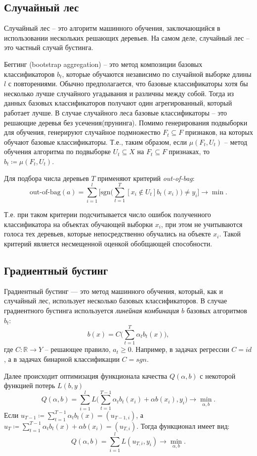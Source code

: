 \subsection{\centering Случайный лес}
Случайный лес -- это алгоритм машинного обучения, заключающийся в использовании нескольких решающих деревьев. На самом деле, случайный лес -- это частный случай бустинга.

Беггинг (bootstrap aggregation) -- это метод композиции базовых классификаторов $b_t$, которые обучаются независимо по случайной выборке длины $l$ с повторениями. Обычно предполагается, что базовые классификаторы хотя бы несколько лучше случайного угадывания и различны между собой. Тогда из данных базовых классификаторов получают один агрегированный, который работает лучше. В случае случайного леса базовые классификаторы -- это решающие деревья без усечения(прунинга). Помимо генерирования подвыборки для обучения, генерируют случайное подмножество $F_t \subseteq F$ признаков, на которых обучают базовые классификаторы. Т.е., таким образом, если $\mu(F_t, U_t)$ -- метод обучения алгоритма по подвыборке $U_t \subseteq X$ на $F_t \subseteq F$ признаках, то $b_t \coloneqq \mu(F_t, U_t)$.

Для подбора числа деревьев $T$ применяют критерий {\it out-of-bag}:
\[
	\mathrm{out\text{-}of\text{-}bag}(a) = \sum\limits_{i=1}^l\big[ \mathrm{sgn}\big(\sum\limits_{t=1}^T [x_i \notin U_t]b_t(x_i) \big) \neq y_i \big] \to \min.
\]

Т.е. при таком критерии подсчитывается число ошибок полученного классификатора на объектах обучающей выборки $x_i$, при этом не учитываются голоса тех деревьев, которые непосредственно обучались на объекте $x_i$. Такой критерий  является несмещенной оценкой обобщающей способности.

\subsection{\centering Градиентный бустинг}
Градиентный бустинг — это метод машинного обучения, который, как и случайный лес, использует несколько базовых классификаторов. В случае градиентного бустинга используется {\it линейная комбинация} $b$ базовых алгоритмов $b_t$:
\[
	b(x) = C\big(\sum\limits_{t=1}^T \alpha_t b_t(x)\big),
\]
где $C: \mathbb{R} \to Y$ -- решающее правило, $a_t \geq 0$. Например, в задачах регрессии $C = id$, а в задачах бинарной классификации $C = sgn$.

Далее происходит оптимизация функционала качества $Q(\alpha, b)$ с некоторой функцией потерь $L(b,y)$
\[
	Q(\alpha, b) = \sum_{i=1}^lL\big(\sum_{t=1}^{T-1} \alpha_t b_t(x_i) + \alpha b(x_i), y_i\big) \to \min\limits_{\alpha, b}.
\]
Если $u_{T-1} \coloneqq \sum\limits_{t=1}^{T-1} \alpha_t b_t(x) = (u_{T-1, i})$, а $u_{T} \coloneqq \sum\limits_{t=1}^{T-1} \alpha_t b_t(x) + \alpha b(x_i) = (u_{T, i})$. Тогда функционал имеет вид:
\[
	Q(\alpha, b) = \sum_{i=1}^l L(u_{T, i}, y_i) \to \min\limits_{\alpha, b}.
\]

